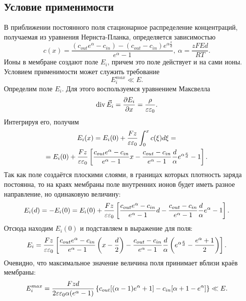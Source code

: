 \subsection{Условие применимости}
    В приближении постоянного поля стационарное распределение концентраций,
    получаемая из уравнения Нернста-Планка, определяется зависимостью
    \[
        c(x) = \frac{(c_{out}e^\alpha - c_{in}) - (c_{out} -
        c_{in})e^{\alpha\frac{x}{d}}}{e^\alpha - 1},\ \alpha = \frac{zFEd}{RT}.
    \]
    Ионы в мембране создают поле \( E_i \), причем это поле действует и на
    сами ионы. Условием применимости может служить требование
    \[
        E_i^{max} \ll E.
    \]
    Определим поле \( E_i \). Для этого воспользуемся уравнением Максвелла
    \[
        \mathrm{div\,}\vec{E}_i = \frac{\partial E_i}{\partial x} = \frac{\rho}{\varepsilon\varepsilon_0}.
    \]
    Интегрируя его, получим
    \begin{gather*}
        E_i(x) = E_i(0) + \frac{Fz}{\varepsilon\varepsilon_0}\int_0^x c(\xi)d\xi = \\
        = E_i(0) + \frac{Fz}{\varepsilon\varepsilon_0}\left[
        \frac{c_{out}e^\alpha - c_{in}}{e^\alpha - 1}x - \frac{c_{out} -
        c_{in}}{e^\alpha - 1}\frac{d}{\alpha}{e^{\alpha\frac{x}{d}} - 1}
        \right].
    \end{gather*}
    Так как поле создаётся плоскими слоями, в границах которых плотность заряда
    постоянна, то на краях мембраны поле внутренних ионов будет иметь разное
    направление, но одинаковую величину:
    \[
        E_i(d) = -E_i(0) = E_i(0) + \frac{Fz}{\varepsilon\varepsilon_0}\left[
        \frac{c_{out}e^\alpha - c_{in}}{e^\alpha - 1}d - \frac{c_{out} -
        c_{in}}{e^\alpha - 1}\frac{d}{\alpha}{e^\alpha - 1}
        \right].
    \]
    Отсюда находим \( E_i(0) \) и подставляем в выражение для поля:
    \[
        E_i = \frac{Fz}{\varepsilon\varepsilon_0}\left[
        \frac{c_{out}e^\alpha - c_{in}}{e^\alpha - 1}\left(x-\frac{d}{2}\right)
        - \frac{c_{out} - c_{in}}{e^\alpha - 1}\frac{d}{\alpha}
        \left(e^{\alpha\frac{x}{d}} - \frac{e^\alpha + 1}{2}\right)
        \right].
    \]
    Очевидно, что максимальное значение величина поля принимает вблизи краёв
    мембраны:
    \[
        E_i^{max} = \frac{Fzd}{2\varepsilon\varepsilon_0\alpha(e^\alpha - 1)}\left\{
            c_{out}[(\alpha - 1)e^\alpha + 1] - c_{in}[\alpha + 1 - e^\alpha]
        \right\} \ll E.
    \]
